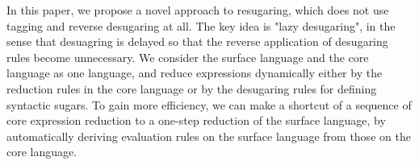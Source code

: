 In this paper, we propose a novel approach to resugaring, which does not use tagging and reverse desugaring at all.
%
%
The key idea is "lazy desugaring", in the sense that desuagring is delayed so that the reverse application of desugaring rules become unnecessary.
We consider the surface language and the core language as one language, and reduce expressions dynamically either by the reduction rules in the core language or by the desugaring rules for defining syntactic sugars. To gain more efficiency, we can make a shortcut of a sequence of core expression reduction to a one-step reduction of the surface language, by automatically deriving evaluation rules on the surface language from those on the core language.
%

